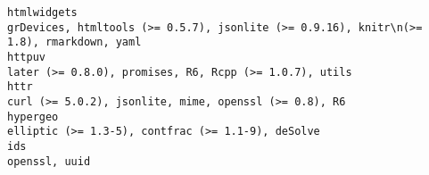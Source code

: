 \documentclass[
  letterpaper,
  DIV=11,
  numbers=noendperiod]{scrreprt}
\begin{document}
\begin{verbatim}
htmlwidgets                                                                                                                                                                                                                                                                                                                                                                                                                                                                                                                        grDevices, htmltools (>= 0.5.7), jsonlite (>= 0.9.16), knitr\n(>= 1.8), rmarkdown, yaml
httpuv                                                                                                                                                                                                                                                                                                                                                                                                                                                                                                                                                              later (>= 0.8.0), promises, R6, Rcpp (>= 1.0.7), utils
httr                                                                                                                                                                                                                                                                                                                                                                                                                                                                                                                                                                 curl (>= 5.0.2), jsonlite, mime, openssl (>= 0.8), R6
hypergeo                                                                                                                                                                                                                                                                                                                                                                                                                                                                                                                                                                 elliptic (>= 1.3-5), contfrac (>= 1.1-9), deSolve
ids                                                                                                                                                                                                                                                                                                                                                                                                                                                                                                                                                                                                          openssl, uuid

\end{verbatim}
\end{document}

